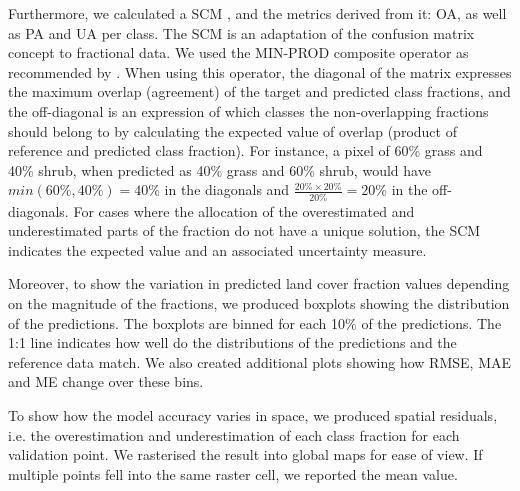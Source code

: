 \documentclass[review,authoryear,3p]{elsarticle}
\begin{document}
Furthermore, we calculated a \gls{SCM} \citep{silvan-cardenas_sub-pixel_2008}, and the metrics derived from it: \ac{OA}, as well as \ac{PA} and \ac{UA} per class.
The \gls{SCM} is an adaptation of the confusion matrix concept to fractional data.
We used the MIN-PROD composite operator as recommended by \citet{silvan-cardenas_sub-pixel_2008}.
When using this operator, the diagonal of the matrix expresses the maximum overlap (agreement) of the target and predicted class fractions, and the off-diagonal is an expression of which classes the non-overlapping fractions should belong to by calculating the expected value of overlap (product of reference and predicted class fraction).
For instance, a pixel of 60\% grass and 40\% shrub, when predicted as 40\% grass and 60\% shrub, would have $min(60\%, 40\%)=40\%$ in the diagonals and $\frac{20\%\times20\%}{20\%}=20\%$ in the off-diagonals.
For cases where the allocation of the overestimated and underestimated parts of the fraction do not have a unique solution, the \ac{SCM} indicates the expected value and an associated uncertainty measure.

Moreover, to show the variation in predicted land cover fraction values depending on the magnitude of the fractions, we produced boxplots showing the distribution of the predictions.
The boxplots are binned for each 10\% of the predictions.
The 1:1 line indicates how well do the distributions of the predictions and the reference data match.
We also created additional plots showing how \gls{RMSE}, \gls{MAE} and \gls{ME} change over these bins.

To show how the model accuracy varies in space, we produced spatial residuals, i.e. the overestimation and underestimation of each class fraction for each validation point.
We rasterised the result into global maps for ease of view.
If multiple points fell into the same raster cell, we reported the mean value.
\end{document}
